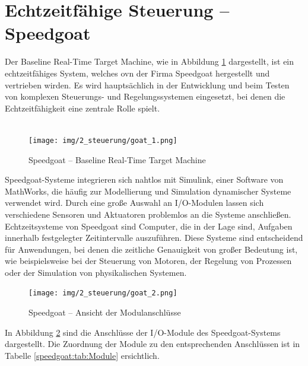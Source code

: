 \newpage


\section{Echtzeitfähige Steuerung – Speedgoat}
\label{section:speedgoat}

Der Baseline Real-Time Target Machine, wie in Abbildung \ref{speedgoat:img:steuerung_goat} dargestellt, ist ein echtzeitfähiges System, welches ovn der Firma Speedgoat hergestellt und vertrieben wirden. Es wird hauptsächlich in der Entwicklung und beim Testen von komplexen Steuerungs- und Regelungssystemen eingesetzt, bei denen die Echtzeitfähigkeit eine zentrale Rolle spielt.\\ \ \\


\pagebreak[1]
\begin{figure}[!ht]
	\begin{center}
		\texttt{[image: img/2\_steuerung/goat\_1.png]}
		\caption{Speedgoat – Baseline Real-Time Target Machine}
		\label{speedgoat:img:steuerung_goat}
	\end{center}
\end{figure}
\pagebreak[1]

Speedgoat-Systeme integrieren sich nahtlos mit Simulink, einer Software von MathWorks, die häufig zur Modellierung und Simulation dynamischer Systeme verwendet wird. Durch eine große Auswahl an I/O-Modulen lassen sich verschiedene Sensoren und Aktuatoren problemlos an die Systeme anschließen.
Echtzeitsysteme von Speedgoat sind Computer, die in der Lage sind, Aufgaben innerhalb festgelegter Zeitintervalle auszuführen. Diese Systeme sind entscheidend für Anwendungen, bei denen die zeitliche Genauigkeit von großer Bedeutung ist, wie beispielsweise bei der Steuerung von Motoren, der Regelung von Prozessen oder der Simulation von physikalischen Systemen.


\pagebreak[1]
\begin{figure}[!ht]
	\begin{center}
		\texttt{[image: img/2\_steuerung/goat\_2.png]}
		\caption{Speedgoat – Ansicht der Modulanschlüsse}
		\label{speedgoat:img:Modulanschlüsse}
	\end{center}
\end{figure}
\pagebreak[1]
In Abbildung \ref{speedgoat:img:Modulanschlüsse} sind die Anschlüsse der I/O-Module des Speedgoat-Systems dargestellt. Die Zuordnung der Module zu den entsprechenden Anschlüssen ist in Tabelle \ref{speedgoat:tab:Module} ersichtlich.

